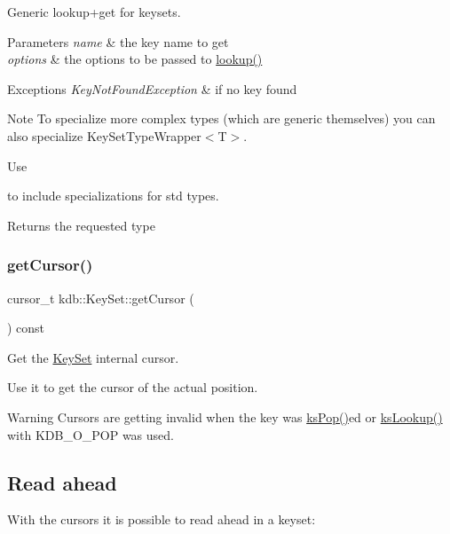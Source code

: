 Generic lookup+get for keysets. 


\begin{DoxyParams}{Parameters}
{\em name} & the key name to get \\
\hline
{\em options} & the options to be passed to \mbox{\hyperlink{classkdb_1_1KeySet_a78125fb19c6aebb0d8fc1a7238b78ace}{lookup()}}\\
\hline
\end{DoxyParams}

\begin{DoxyExceptions}{Exceptions}
{\em Key\+Not\+Found\+Exception} & if no key found\\
\hline
\end{DoxyExceptions}
\begin{DoxyNote}{Note}
To specialize more complex types (which are generic themselves) you can also specialize Key\+Set\+Type\+Wrapper$<$\+T$>$.
\end{DoxyNote}
Use 
\begin{DoxyCode}{0}
\end{DoxyCode}
 to include specializations for std types.

\begin{DoxyReturn}{Returns}
the requested type 
\end{DoxyReturn}
\mbox{\label{classkdb_1_1KeySet_a6f93621c0baab89dfa122391e3117f34}} 
\subsubsection{\texorpdfstring{getCursor()}{getCursor()}}
{\footnotesize\ttfamily cursor\+\_\+t kdb\+::\+Key\+Set\+::get\+Cursor (\begin{DoxyParamCaption}{ }\end{DoxyParamCaption}) const\hspace{0.3cm}{\ttfamily [inline]}}



Get the \mbox{\hyperlink{classkdb_1_1KeySet}{Key\+Set}} internal cursor. 

Use it to get the cursor of the actual position.

\begin{DoxyWarning}{Warning}
Cursors are getting invalid when the key was \mbox{\hyperlink{group__keyset_gae42530b04defb772059de0600159cf69}{ks\+Pop()}}ed or \mbox{\hyperlink{group__keyset_gaa34fc43a081e6b01e4120daa6c112004}{ks\+Lookup()}} with K\+D\+B\+\_\+\+O\+\_\+\+P\+OP was used.
\end{DoxyWarning}
\hypertarget{group__keyset_readahead}{}\subsection{Read ahead}\label{group__keyset_readahead}
With the cursors it is possible to read ahead in a keyset\+:


